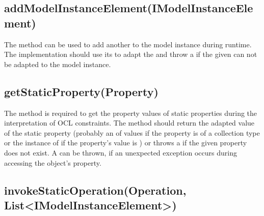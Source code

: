 \subsection{addModelInstanceElement(IModelInstanceElement)}
\label{sect:modelInstanceTypeAdaptation:addIMIElement}

The method  can be used to 
add another  to the model instance during runtime. The
implementation should use its  to adapt the 
 and throw a  if the given 
 can not be adapted to the model instance.


\subsection{getStaticProperty(Property)}

The method  is required to get the property 
values of static properties during the interpretation of \acs{OCL} constraints. 
The method should return the adapted value of the static property (probably an 
 of values if the property is of a collection
type or the instance of  if the property's value is ) or
throws a  if the given property does not exist. 
A  can be thrown, if an unexpected exception 
occurs during accessing the object's property.


\subsection{invokeStaticOperation(Operation, List<IModelInstanceElement>)}
			
